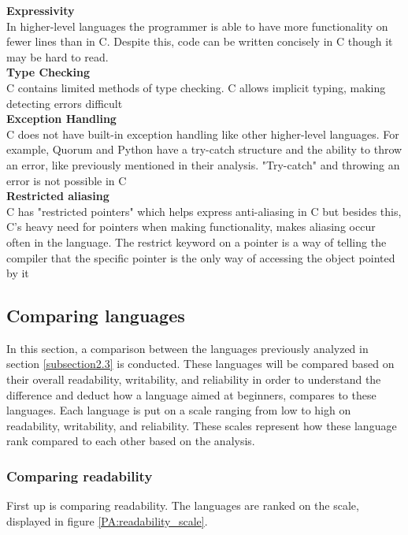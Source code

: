 \noindent\textbf{Expressivity}\\
\noindent In higher-level languages the programmer is able to have more functionality on fewer lines than in C. Despite this, code can be written concisely in C though it may be hard to read.\\

\noindent\textbf{Type Checking}\\
\noindent C contains limited methods of type checking. C allows implicit typing, making detecting errors difficult\\

\noindent\textbf{Exception Handling}\\
\noindent C does not have built-in exception handling like other higher-level languages. For example, Quorum and Python have a try-catch structure and the ability to throw an error, like previously mentioned in their analysis. "Try-catch" and throwing an error is not possible in C\\

\noindent\textbf{Restricted aliasing}\\
\noindent C has "restricted pointers" which helps express anti-aliasing in C but besides this, C's heavy need for pointers when making functionality, makes aliasing occur often in the language. The restrict keyword on a pointer is a way of telling the compiler that the specific pointer is the only way of accessing the object pointed by it \\

\subsection{Comparing languages} \label{ComparingLanguages}
In this section, a comparison between the languages previously analyzed in section \ref{subsection2.3} is conducted. These languages will be compared based on their overall readability, writability, and reliability in order to understand the difference and deduct how a language aimed at beginners, compares to these languages. Each language is put on a scale ranging from low to high on readability, writability, and reliability. These scales represent how these language rank compared to each other based on the analysis.

\newpage
\subsubsection{Comparing readability}
First up is comparing readability. The languages are ranked on the scale,  displayed in figure \ref{PA:readability_scale}. 

